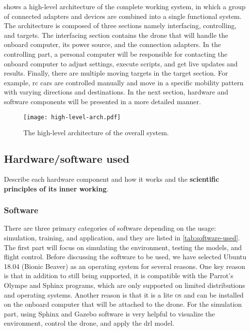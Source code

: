 \documentclass[../main.tex]{subfiles}
\begin{document}
 shows a high-level architecture 
of the complete working system, in which a group 
of connected adapters and devices are combined into 
a single functional system. 
The architecture is composed of three sections namely
interfacing, controlling, and targets. 
The interfacing section contains the drone that 
will handle the onboard computer, its power source, 
and the connection adapters. 
In the controlling part, a personal computer 
will be responsible for contacting the onboard computer 
to adjust settings, execute scripts, and get 
live updates and results. 
Finally, there are multiple moving targets 
in the target section. For example, 
\gls{rc} cars are controlled manually and move in 
a specific mobility pattern with varying directions 
and destinations. 
In the next section, hardware and software components 
will be presented in a more detailed manner.

\begin{figure}[h]
    \centering
    \texttt{[image: high-level-arch.pdf]}
    \caption{The high-level architecture of the overall system.}
    \label{fig:arch-fig}
\end{figure}

\subsection{Hardware/software used}

\begin{newrequirements}
    \begin{todolist}
    \item [\done] Describe each hardware component and how it works 
        and the \textbf{scientific principles of its 
        inner working}.
    \end{todolist}
\end{newrequirements}


\subsubsection{Software}

There are three primary categories of software 
depending on the usage: simulation, training, 
and application, and they are listed in \cref{tab:software-used}. The first part will focus on 
simulating the environment, testing the models, 
and flight control. Before discussing the software 
to be used, we have selected Ubuntu 18.04 (Bionic Beaver) 
as an operating system for several reasons. 
One key reason is that in addition to
still being supported, it is compatible with the 
Parrot's Olympe and Sphinx programs, which are only 
supported on limited distributions and operating systems.
Another reason is that it is a lite \textsc{os} 
and can be installed on the onboard computer that 
will be attached to the drone. For the simulation part, 
using Sphinx and Gazebo software is very helpful
to visualize the environment, control the drone, 
and apply the \gls{drl} model. 
\end{document}
